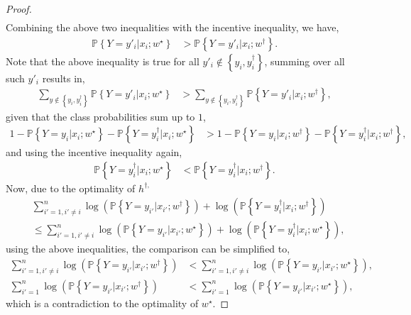 \documentclass{article}
\begin{document}
\begin{proof}
\begin{align*}
\end{align*}
Combining the above two inequalities with the incentive inequality, we have,
\begin{align*}
\mathbb{P}\left\{Y = y'_{i} | x_{i} ; w^\star \right\} &> \mathbb{P}\left\{Y = y'_{i} | x_{i} ; w^{\dagger}\right\}.
\end{align*}
Note that the above inequality is true for all $y'_{i} \notin \left\{y_{i}, y^{\dagger}_{i}\right\}$, summing over all such $y'_{i}$ results in,
\begin{align*}
\displaystyle\sum_{y \notin \left\{y_{i}, y^{\dagger}_{i}\right\}} \mathbb{P}\left\{Y = y'_{i} | x_{i} ; w^\star \right\} &> \displaystyle\sum_{y \notin \left\{y_{i}, y^{\dagger}_{i}\right\}} \mathbb{P}\left\{Y = y'_{i} | x_{i} ; w^{\dagger}\right\},
\end{align*}
given that the class probabilities sum up to $1$,
\begin{align*}
1 - \mathbb{P}\left\{Y = y_{i} | x_{i} ; w^\star \right\} - \mathbb{P}\left\{Y = y^{\dagger}_{i} | x_{i} ; w^\star \right\} &> 1 - \mathbb{P}\left\{Y = y_{i} | x_{i} ; w^{\dagger}\right\} - \mathbb{P}\left\{Y = y^{\dagger}_{i} | x_{i} ; w^{\dagger}\right\},
\end{align*}
and using the incentive inequality again,
\begin{align*}
\mathbb{P}\left\{Y = y^{\dagger}_{i} | x_{i} ; w^\star \right\} &< \mathbb{P}\left\{Y = y^{\dagger}_{i} | x_{i} ; w^{\dagger}\right\}.
\end{align*}
Now, due to the optimality of $h^{\dagger,}$
\begin{align*}
&  \displaystyle\sum_{i'=1, i' \neq  i}^{n} \log\left(\mathbb{P}\left\{Y = y_{i'} | x_{i'} ; w^{\dagger}\right\}\right) + \log\left(\mathbb{P}\left\{Y = y^{\dagger}_{i} | x_{i} ; w^{\dagger}\right\}\right)
\\ &\leq  \displaystyle\sum_{i'=1, i' \neq  i}^{n} \log\left(\mathbb{P}\left\{Y = y_{i'} | x_{i'} ; w^\star \right\}\right) + \log\left(\mathbb{P}\left\{Y = y^{\dagger}_{i} | x_{i} ; w^\star \right\}\right),
\end{align*}
using the above inequalities, the comparison can be simplified to,
\begin{align*}
\displaystyle\sum_{i'=1, i' \neq  i}^{n} \log\left(\mathbb{P}\left\{Y = y_{i'} | x_{i'} ; w^{\dagger}\right\}\right) &< \displaystyle\sum_{i'=1, i' \neq  i}^{n} \log\left(\mathbb{P}\left\{Y = y_{i'} | x_{i'} ; w^\star \right\}\right),
\\ \displaystyle\sum_{i'=1}^{n} \log\left(\mathbb{P}\left\{Y = y_{i'} | x_{i'} ; w^{\dagger}\right\}\right) &< \displaystyle\sum_{i'=1}^{n} \log\left(\mathbb{P}\left\{Y = y_{i'} | x_{i'} ; w^\star \right\}\right),
\end{align*}
which is a contradiction to the optimality of $w^\star $.
\newline \newline\end{proof}
\end{document}
